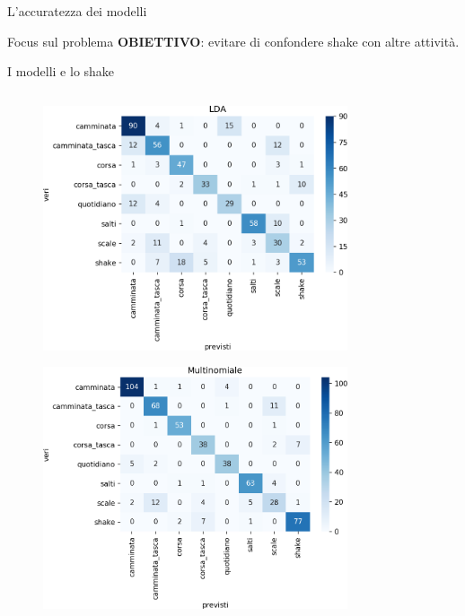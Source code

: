 \documentclass{beamer}
\begin{document}
\begin{frame}{L'accuratezza dei modelli}

\end{frame}

\begin{frame}{Focus sul problema}
\textbf{OBIETTIVO}: evitare di confondere shake con altre attività.

\end{frame}

\begin{frame}{I modelli e lo shake}
\begin{columns}[T] %
\begin{column}{.5\textwidth}
\begin{figure}[H]
\includegraphics[width=0.8\textwidth]{../figure/confusionMatrix-LDA.png}
\end{figure}
\begin{figure}[H]
\includegraphics[width=0.8\textwidth]{../figure/confusionMatrix-Mn.png}

\end{figure}
\end{column}
\end{columns}
\end{frame}
\end{document}
